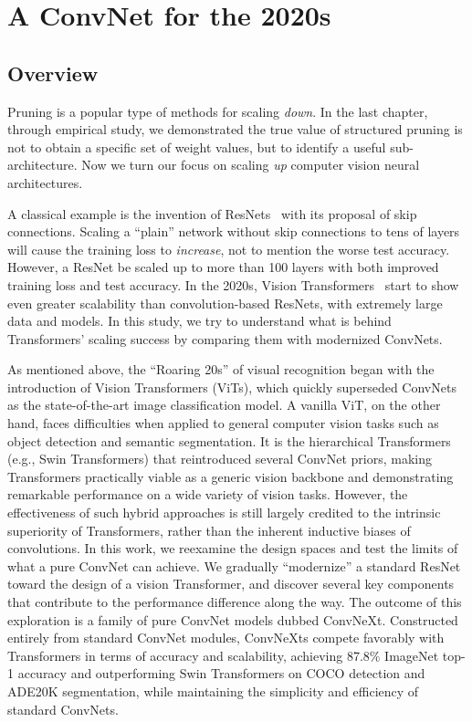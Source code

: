 \chapter{A ConvNet for the 2020s}

\section{Overview}
Pruning is a popular type of methods for scaling \emph{down}. In the last chapter, through empirical study, we demonstrated the true value of structured pruning is not to obtain a specific set of weight values, but to identify a useful sub-architecture. Now we turn our focus on scaling \emph{up} computer vision neural architectures. 

A classical example is the invention of ResNets~\cite{resnet} with its proposal of skip connections. Scaling a ``plain'' network without skip connections to tens of layers will cause the training loss to \emph{increase}, not to mention the worse test accuracy. However, a ResNet be scaled up to more than 100 layers with both improved training loss and test accuracy. In the 2020s, Vision Transformers~\cite{Dosovitskiy2021} start to show even greater scalability than convolution-based ResNets, with extremely large data and models. In this study, we try to understand what is behind Transformers' scaling success by comparing them with modernized ConvNets.


As mentioned above, the ``Roaring 20s'' of visual recognition began with the introduction of Vision Transformers (ViTs), which quickly superseded ConvNets as the state-of-the-art image classification model. A vanilla ViT, on the other hand, faces difficulties when applied to general computer vision tasks such as object detection and semantic segmentation. It is the hierarchical Transformers (e.g., Swin Transformers) that reintroduced several ConvNet priors, making Transformers practically viable as a generic vision backbone and demonstrating remarkable performance on a wide variety of vision tasks. However, the effectiveness of such hybrid approaches is still largely credited to the intrinsic superiority of Transformers, rather than the inherent inductive biases of convolutions. In this work, we reexamine the design spaces and test the limits of what a pure ConvNet can achieve. We gradually ``modernize'' a standard ResNet toward the design of a vision Transformer, and discover several key components that contribute to the performance difference along the way. The outcome of this exploration is a family of pure ConvNet models dubbed ConvNeXt. Constructed entirely from standard ConvNet modules, ConvNeXts compete favorably with Transformers in terms of accuracy and scalability, achieving 87.8\% ImageNet top-1 accuracy and outperforming Swin Transformers on COCO detection and ADE20K segmentation, while maintaining the simplicity and efficiency of standard ConvNets. 


